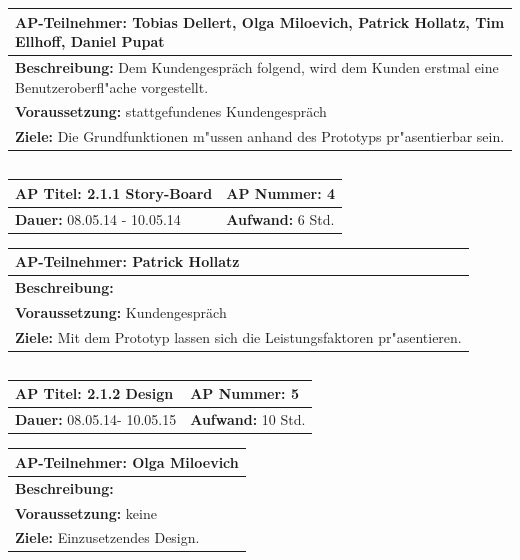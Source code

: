 \documentclass[fontsize=12pt,paper=a4,twoside]{scrartcl}
\begin{document}
\begin{tabular}{|p{15.3cm}|}
\hline
\textbf{AP-Teilnehmer: }Tobias Dellert, Olga Miloevich, Patrick Hollatz, Tim Ellhoff, Daniel Pupat\\
\hline
\textbf{Beschreibung: }Dem Kundengespräch folgend, wird dem Kunden erstmal eine Benutzeroberfl"ache vorgestellt.\\
\hline
\textbf{Voraussetzung: }stattgefundenes Kundengespräch\\
\hline 
\textbf{Ziele: }Die Grundfunktionen m"ussen anhand des Prototyps pr"asentierbar sein.\\
\hline 
\end{tabular}
\begin{verbatim}

\end{verbatim}
\begin{tabular}{|p{7.43cm}|p{7.43cm}|}
\hline
\textbf{AP Titel: }2.1.1 Story-Board & \textbf{AP Nummer: }4 \\ 
\hline
\textbf{Dauer: }08.05.14 - 10.05.14 & \textbf{Aufwand: }6 Std.\\
\hline
\end{tabular}
\begin{tabular}{|p{15.3cm}|}
\hline
\textbf{AP-Teilnehmer: }Patrick Hollatz\\
\hline
\textbf{Beschreibung: }\\
\hline
\textbf{Voraussetzung: }Kundengespräch\\
\hline 
\textbf{Ziele: }Mit dem Prototyp lassen sich die Leistungsfaktoren pr"asentieren.\\
\hline 
\end{tabular}
\begin{verbatim}

\end{verbatim}
\begin{tabular}{|p{7.43cm}|p{7.43cm}|}
\hline
\textbf{AP Titel: }2.1.2 Design & \textbf{AP Nummer: }5 \\ 
\hline
\textbf{Dauer: }08.05.14- 10.05.15 & \textbf{Aufwand: }10 Std.\\
\hline
\end{tabular}
\begin{tabular}{|p{15.3cm}|}
\hline
\textbf{AP-Teilnehmer: }Olga Miloevich\\
\hline
\textbf{Beschreibung: }\\
\hline
\textbf{Voraussetzung: }keine\\
\hline 
\textbf{Ziele: }Einzusetzendes Design.\\
\hline 
\end{tabular}
\end{document}
